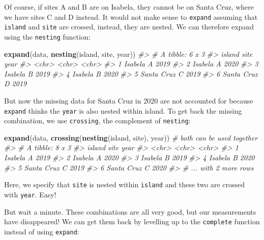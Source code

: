 \documentclass[]{book}
\newenvironment{Shaded}{}{}
\newcommand{\CommentTok}[1]{\textcolor[rgb]{0.38,0.63,0.69}{\textit{#1}}}
\newcommand{\KeywordTok}[1]{\textcolor[rgb]{0.00,0.44,0.13}{\textbf{#1}}}
\newcommand{\NormalTok}[1]{#1}
\begin{document}
Of course, if sites A and B are on Isabela, they cannot be on Santa Cruz, where we have sites C and D instead. It would not make sense to \texttt{expand} assuming that \texttt{island} and \texttt{site} are crossed, instead, they are nested. We can therefore expand using the \texttt{nesting} function:

\begin{Shaded}
\begin{Highlighting}[]
\KeywordTok{expand}\NormalTok{(data, }\KeywordTok{nesting}\NormalTok{(island, site, year))}
\CommentTok{#> # A tibble: 6 x 3}
\CommentTok{#>   island     site  year }
\CommentTok{#>   <chr>      <chr> <chr>}
\CommentTok{#> 1 Isabela    A     2019 }
\CommentTok{#> 2 Isabela    A     2020 }
\CommentTok{#> 3 Isabela    B     2019 }
\CommentTok{#> 4 Isabela    B     2020 }
\CommentTok{#> 5 Santa Cruz C     2019 }
\CommentTok{#> 6 Santa Cruz D     2019}
\end{Highlighting}
\end{Shaded}

But now the missing data for Santa Cruz in 2020 are not accounted for because \texttt{expand} thinks the \texttt{year} is also nested within island. To get back the missing combination, we use \texttt{crossing}, the complement of \texttt{nesting}:

\begin{Shaded}
\begin{Highlighting}[]
\KeywordTok{expand}\NormalTok{(data, }\KeywordTok{crossing}\NormalTok{(}\KeywordTok{nesting}\NormalTok{(island, site), year)) }\CommentTok{# both can be used together}
\CommentTok{#> # A tibble: 8 x 3}
\CommentTok{#>   island     site  year }
\CommentTok{#>   <chr>      <chr> <chr>}
\CommentTok{#> 1 Isabela    A     2019 }
\CommentTok{#> 2 Isabela    A     2020 }
\CommentTok{#> 3 Isabela    B     2019 }
\CommentTok{#> 4 Isabela    B     2020 }
\CommentTok{#> 5 Santa Cruz C     2019 }
\CommentTok{#> 6 Santa Cruz C     2020 }
\CommentTok{#> # ... with 2 more rows}
\end{Highlighting}
\end{Shaded}

Here, we specify that \texttt{site} is nested within \texttt{island} and these two are crossed with \texttt{year}. Easy!

But wait a minute. These combinations are all very good, but our measurements have disappeared! We can get them back by levelling up to the \texttt{complete} function instead of using \texttt{expand}:
\end{document}
